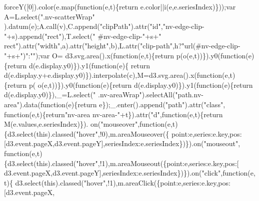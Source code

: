 \begin{DoxyCode}
      forceY([0]).color(e.map(\textcolor{keyword}{function}(e,t)\{return e.color||i(e,e.seriesIndex)\}));var A=L.select(\textcolor{stringliteral}{".nv-scatterWrap"}
      ).datum(e);A.call(v),C.append(\textcolor{stringliteral}{"clipPath"}).attr(\textcolor{stringliteral}{"id"},\textcolor{stringliteral}{"nv-edge-clip-"}+s).append(\textcolor{stringliteral}{"rect"}),T.select(\textcolor{stringliteral}{"
      #nv-edge-clip-"}+s+\textcolor{stringliteral}{" rect"}).attr(\textcolor{stringliteral}{"width"},a).attr(\textcolor{stringliteral}{"height"},b),L.attr(\textcolor{stringliteral}{"clip-path"},h?\textcolor{stringliteral}{"url(#nv-edge-clip-"}+s+\textcolor{stringliteral}{")"}:\textcolor{stringliteral}{""});var O=
      d3.svg.area().x(\textcolor{keyword}{function}(e,t)\{\textcolor{keywordflow}{return} p(o(e,t))\}).y0(\textcolor{keyword}{function}(e)\{\textcolor{keywordflow}{return} d(e.display.y0)\}).y1(\textcolor{keyword}{function}(e)\{\textcolor{keywordflow}{
      return} d(e.display.y+e.display.y0)\}).interpolate(c),M=d3.svg.area().x(\textcolor{keyword}{function}(e,t)\{\textcolor{keywordflow}{return} p(
      o(e,t))\}).y0(\textcolor{keyword}{function}(e)\{\textcolor{keywordflow}{return} d(e.display.y0)\}).y1(\textcolor{keyword}{function}(e)\{\textcolor{keywordflow}{return} d(e.display.y0)\}),\_=L.select(\textcolor{stringliteral}{"
      .nv-areaWrap"}).selectAll(\textcolor{stringliteral}{"path.nv-area"}).data(\textcolor{keyword}{function}(e)\{\textcolor{keywordflow}{return} e\});\_.enter().append(\textcolor{stringliteral}{"path"}).attr(\textcolor{stringliteral}{"class"},\textcolor{keyword}{
      function}(e,t)\{\textcolor{keywordflow}{return}\textcolor{stringliteral}{"nv-area nv-area-"}+t\}).attr(\textcolor{stringliteral}{"d"},\textcolor{keyword}{function}(e,t)\{\textcolor{keywordflow}{return} M(e.values,e.seriesIndex)\}).
      on(\textcolor{stringliteral}{"mouseover"},\textcolor{keyword}{function}(e,t)\{d3.select(\textcolor{keyword}{this}).classed(\textcolor{stringliteral}{"hover"},!0),m.areaMouseover(\{
      point:e,series:e.key,pos:[d3.event.pageX,d3.event.pageY],seriesIndex:e.seriesIndex\})\}).on(\textcolor{stringliteral}{"mouseout"},\textcolor{keyword}{
      function}(e,t)\{d3.select(\textcolor{keyword}{this}).classed(\textcolor{stringliteral}{"hover"},!1),m.areaMouseout(\{point:e,series:e.key,pos:[
      d3.event.pageX,d3.event.pageY],seriesIndex:e.seriesIndex\})\}).on(\textcolor{stringliteral}{"click"},\textcolor{keyword}{function}(e,t)\{
      d3.select(\textcolor{keyword}{this}).classed(\textcolor{stringliteral}{"hover"},!1),m.areaClick(\{point:e,series:e.key,pos:[d3.event.pageX,

\end{DoxyCode}
